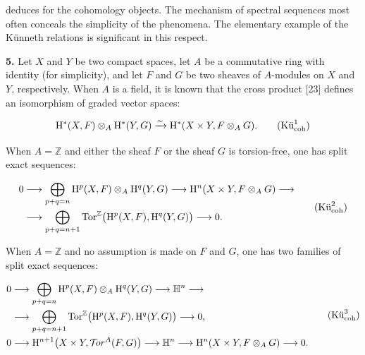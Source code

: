 %
deduces for the cohomology objects. The mechanism of spectral sequences most
often conceals the simplicity of the phenomena. The elementary example of
the Künneth relations is significant in this respect.

\noindent\textbf{5.}\quad
Let $X$ and $Y$ be two compact spaces, let $A$ be a commutative ring with
identity (for simplicity), and let $F$ and $G$ be two sheaves of $A$-modules
on $X$ and $Y$, respectively. When $A$ is a field, it is known that the cross
product [23] defines an isomorphism of graded vector spaces:

\begin{equation}
\mathrm H^*(X,F)\otimes_A\mathrm H^*(Y,G)
\xrightarrow{\sim}
\mathrm H^*(X\times Y,F\otimes_A G).
\tag{$\text{Kü}_{\mathrm{coh}}^{1}$}
\end{equation}

When $A=\mathbb Z$ and either the sheaf $F$ or the sheaf $G$ is torsion-free,
one has split exact sequences:

\begin{equation}
\begin{aligned}
0 &\longrightarrow
\bigoplus_{p+q=n}\mathrm H^p(X,F)\otimes_A\mathrm H^q(Y,G)
\longrightarrow \mathrm H^n(X\times Y,F\otimes_A G) \longrightarrow \\
&\longrightarrow
\bigoplus_{p+q=n+1}
\operatorname{Tor}^{\mathbb Z}\bigl(\mathrm H^p(X,F),\mathrm H^q(Y,G)\bigr)
\longrightarrow 0.
\end{aligned}
\tag{$\text{Kü}_{\mathrm{coh}}^{2}$}
\end{equation}

When $A=\mathbb Z$ and no assumption is made on $F$ and $G$, one has two
families of split exact sequences:

\begin{equation}
\begin{aligned}
0 &\longrightarrow
\bigoplus_{p+q=n}\mathrm H^p(X,F)\otimes_A\mathrm H^q(Y,G)
\longrightarrow \mathbb H^n \longrightarrow \\
&\longrightarrow
\bigoplus_{p+q=n+1}
\operatorname{Tor}^{\mathbb Z}\bigl(\mathrm H^p(X,F),\mathrm H^q(Y,G)\bigr)
\longrightarrow 0, \\
0 &\longrightarrow
\mathrm H^{n+1}\bigl(X\times Y,\mathcal T\!or^A(F,G)\bigr)
\longrightarrow \mathbb H^n
\longrightarrow \mathrm H^n(X\times Y,F\otimes_A G)
\longrightarrow 0.
\end{aligned}
\tag{$\text{Kü}_{\mathrm{coh}}^{3}$}
\end{equation}

